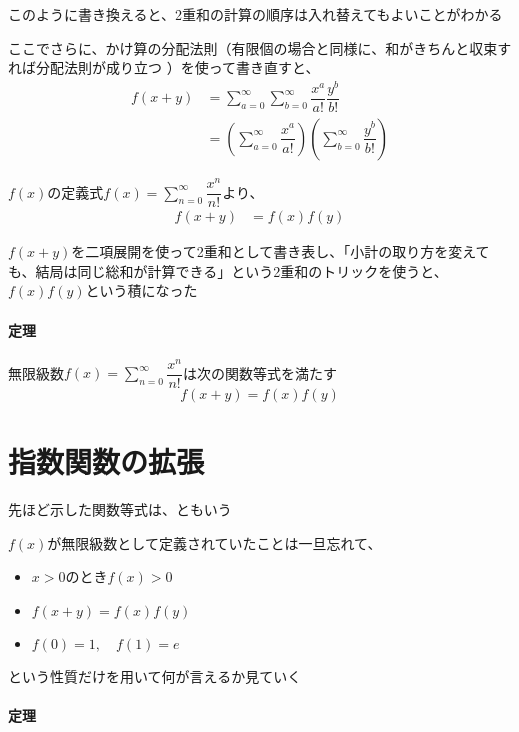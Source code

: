 \documentclass[../book_jiriki_calc]{subfiles}
\begin{document}
このように書き換えると、2重和の計算の順序は入れ替えてもよいことがわかる

\sectionline

ここでさらに、かけ算の分配法則（有限個の場合と同様に、和がきちんと収束すれば分配法則が成り立つ
）を使って書き直すと、
\begin{align}
  f(x+y) & = \sum_{a=0}^{\infty} \sum_{b=0}^{\infty} \dfrac{x^a}{a!} \dfrac{y^b}{b!}                           \\
         & = \left(\sum_{a=0}^{\infty} \dfrac{x^a}{a!}\right) \left(\sum_{b=0}^{\infty} \dfrac{y^b}{b!}\right)
\end{align}

$f(x)$の定義式$\displaystyle f(x) = \sum_{n=0}^{\infty} \dfrac{x^n}{n!}$より、
\begin{align}
  f(x+y) & = f(x)f(y)
\end{align}

$f(x+y)$を二項展開を使って2重和として書き表し、「小計の取り方を変えても、結局は同じ総和が計算できる」という2重和のトリックを使うと、$f(x)f(y)$という積になった

\sectionline

\paragraph{定理}

無限級数$\displaystyle f(x) = \sum_{n=0}^{\infty} \dfrac{x^n}{n!}$は次の関数等式を満たす
\begin{equation}
  f(x+y) = f(x)f(y)
\end{equation}

\section{指数関数の拡張}

先ほど示した関数等式は、ともいう

\sectionline

$f(x)$が無限級数として定義されていたことは一旦忘れて、
\begin{itemize}
  \item $x>0$のとき$f(x)>0$
  \item $f(x+y)=f(x)f(y)$
  \item $f(0)=1,\quad f(1) = e$
\end{itemize}
という性質だけを用いて何が言えるか見ていく

\sectionline

\paragraph{定理}
\end{document}
